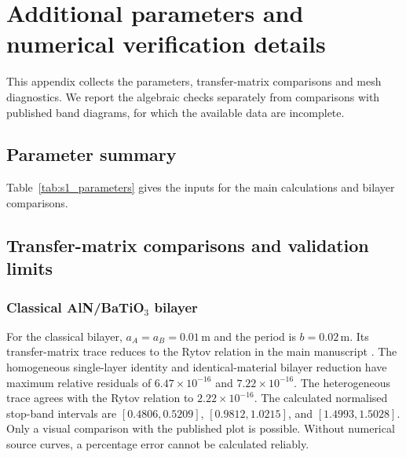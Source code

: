 \section{Additional parameters and numerical verification details}
\label{app:extended_checks}

This appendix collects the parameters, transfer-matrix comparisons and mesh diagnostics. We report the algebraic checks separately from comparisons with published band diagrams, for which the available data are incomplete.

\subsection{Parameter summary}
\label{app:parameter_summary}
Table~\ref{tab:s1_parameters} gives the inputs for the main calculations and bilayer comparisons.


\subsection{Transfer-matrix comparisons and validation limits}
\label{app:transfer_checks}
\subsubsection{Classical AlN/BaTiO$_3$ bilayer}
For the classical bilayer, $a_A=a_B=0.01\,\mathrm{m}$ and the period is $b=0.02\,\mathrm{m}$. Its transfer-matrix trace reduces to the Rytov relation in the main manuscript \cite{li2024anchorB,zhengwei2009}. The homogeneous single-layer identity and identical-material bilayer reduction have maximum relative residuals of $6.47\times10^{-16}$ and $7.22\times10^{-16}$. The heterogeneous trace agrees with the Rytov relation to $2.22\times10^{-16}$. The calculated normalised stop-band intervals are $[0.4806,0.5209]$, $[0.9812,1.0215]$, and $[1.4993,1.5028]$. Only a visual comparison with the published plot is possible. Without numerical source curves, a percentage error cannot be calculated reliably.

